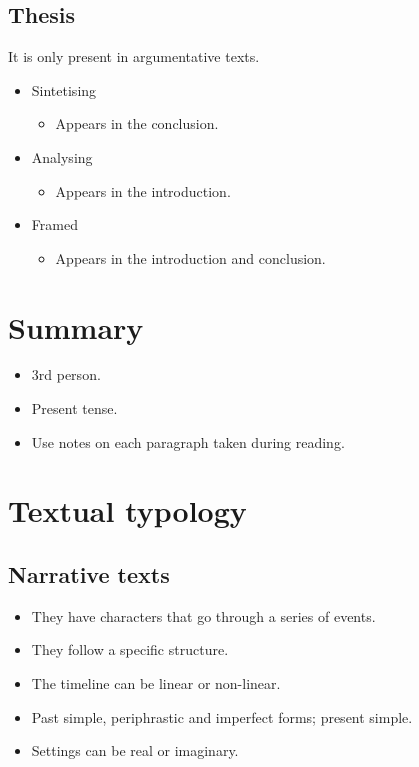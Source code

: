 \documentclass{article}
\begin{document}
\subsection*{Thesis}

It is only present in argumentative texts.

\begin{itemize}
    \item Sintetising
    \begin{itemize}
        \item Appears in the conclusion.
    \end{itemize}
    \item Analysing
    \begin{itemize}
        \item Appears in the introduction.
    \end{itemize}
    \item Framed
    \begin{itemize}
        \item Appears in the introduction and conclusion.
    \end{itemize}
\end{itemize}

\section*{Summary}

\begin{itemize}
    \item 3rd person.
    \item Present tense.
    \item Use notes on each paragraph taken during reading.
\end{itemize}

\section*{Textual typology}

\subsection*{Narrative texts}

\begin{itemize}
    \item They have characters that go through a series of events.
    \item They follow a specific structure.
    \item The timeline can be linear or non-linear.
    \item Past simple, periphrastic and imperfect forms; present simple.
    \item Settings can be real or imaginary.
\end{itemize}
\end{document}
